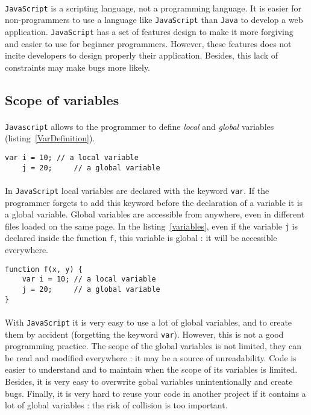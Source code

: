 \paragraph{} 
\texttt{JavaScript} is a scripting language, not a programming language. It is easier for non-programmers to use a language like \texttt{JavaScript} than \texttt{Java} to develop a web application. \texttt{JavaScript} has a set of features design to make it more forgiving and easier to use for beginner programmers. However, these features does not incite developers to design properly their application. Besides, this lack of constraints may make bugs more likely. 

\subsection{Scope of variables}

\paragraph{}
\texttt{Javascript} allows to the programmer to define \emph{local} and \emph{global} variables (listing~\ref{VarDefinition}).
\begin{lstlisting}[caption={Defining variables}, label={VarDefinition}]
    var i = 10; // a local variable
    j = 20;     // a global variable
\end{lstlisting}

\paragraph{}
In \texttt{JavaScript} local variables are declared with the keyword \texttt{var}. If the programmer forgets to add this keyword before the declaration of a variable it is a global variable. Global variables are accessible from anywhere, even in different files loaded on the same page. In the listing~\ref{variables}, even if the variable \texttt{j} is declared inside the function \texttt{f}, this variable is global : it will be accessible everywhere.  
\begin{lstlisting}[caption={Global and local variables}, label={variables}]
function f(x, y) {
    var i = 10; // a local variable
    j = 20;     // a global variable
}
\end{lstlisting}

\paragraph{}
With \texttt{JavaScript} it is very easy to use a lot of global variables, and to create them by accident (forgetting the keyword \texttt{var}). However, this is not a good programming practice. The scope of the global variables is not limited, they can be read and modified everywhere : it may be a source of unreadability. Code is easier to understand and to maintain when the scope of its variables is limited. Besides, it is very easy to overwrite gobal variables unintentionally and create bugs. Finally, it is very hard to reuse your code in another project if it contains a lot of global variables : the risk of collision is too important.

